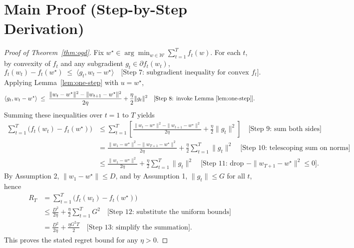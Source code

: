 \documentclass[12pt]{article}
\begin{document}
\section*{Main Proof (Step-by-Step Derivation)}
\begin{proof}[Proof of Theorem~\ref{thm:ogd}]
Fix $w^\star\in\arg\min_{w\in\mathcal{W}}\sum_{t=1}^T f_t(w)$. For each $t$, by convexity of $f_t$ and any subgradient $g_t\in \partial f_t(w_t)$,
\[
f_t(w_t) - f_t(w^\star) \;\le\; \langle g_t, w_t - w^\star\rangle 
\quad \text{[Step 7: subgradient inequality for convex }f_t\text{]}.
\]
Applying Lemma~\ref{lem:one-step} with $u=w^\star$,
\[
\langle g_t, w_t - w^\star\rangle 
\;\le\; \frac{\|w_t-w^\star\|^2 - \|w_{t+1}-w^\star\|^2}{2\eta} + \frac{\eta}{2}\|g_t\|^2 
\quad \text{[Step 8: invoke Lemma~\ref{lem:one-step}]}.
\]
Summing these inequalities over $t=1$ to $T$ yields
\begin{align*}
\sum_{t=1}^T \bigl(f_t(w_t) - f_t(w^\star)\bigr)
&\le \sum_{t=1}^T \left[\frac{\|w_t-w^\star\|^2 - \|w_{t+1}-w^\star\|^2}{2\eta} + \frac{\eta}{2}\|g_t\|^2\right]
\quad \text{[Step 9: sum both sides]}\\
&= \frac{\|w_1-w^\star\|^2 - \|w_{T+1}-w^\star\|^2}{2\eta} + \frac{\eta}{2}\sum_{t=1}^T \|g_t\|^2 
\quad \text{[Step 10: telescoping sum on norms]}\\
&\le \frac{\|w_1-w^\star\|^2}{2\eta} + \frac{\eta}{2}\sum_{t=1}^T \|g_t\|^2 
\quad \text{[Step 11: drop }-\|w_{T+1}-w^\star\|^2 \le 0\text{]}.
\end{align*}
By Assumption 2, $\|w_1-w^\star\|\le D$, and by Assumption 1, $\|g_t\|\le G$ for all $t$, hence
\begin{align*}
R_T 
&= \sum_{t=1}^T \bigl(f_t(w_t) - f_t(w^\star)\bigr) \\
&\le \frac{D^2}{2\eta} + \frac{\eta}{2} \sum_{t=1}^T G^2 
\quad \text{[Step 12: substitute the uniform bounds]}\\
&= \frac{D^2}{2\eta} + \frac{\eta G^2 T}{2} 
\quad \text{[Step 13: simplify the summation]}.
\end{align*}
This proves the stated regret bound for any $\eta>0$. \qedhere
\end{proof}
\end{document}
